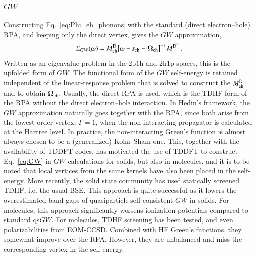 \documentclass[aip,jcp,reprint,noshowkeys,superscriptaddress]{revtex4-1}
\newcommand{\hhp}{\text{2h1p}}
\newcommand{\pph}{\text{2p1h}}
\newcommand{\eh}{\text{eh}}
\begin{document}
\subsubsection{$GW$}

Constructing Eq.~\eqref{eq:Phi_eh_phonons} with the standard (direct
electron--hole) RPA, and keeping only the direct vertex, gives the $GW$
approximation, 
\begin{equation}
\Sigma_{GW}(\omega)
=
M^{\rm D}_{\eh}
\big[
\omega-s_{\eh}-\boldsymbol\Omega_{\eh}
\big]^{-1}
M^{\rm D^{\dagger}} \;.
\label{eq:GW}
\end{equation}
Written as an eigenvalue problem in the $\pph$ and $\hhp$ spaces, this is
the upfolded form of $GW$.\cite{Bintrim2021,Monino2023}
The functional form of the $GW$ self-energy is retained independent of the 
linear-response problem that is solved to construct the $M^{\rm D}_{\eh}$ and to 
obtain $\boldsymbol\Omega_{\eh}$. Usually, the direct RPA is used, which is 
the TDHF form of the RPA without the direct electron--hole interaction. 
In Hedin's framework, the $GW$ approximation naturally goes together with the RPA, 
since both arise from the lowest-order vertex, $\Gamma=1$, when the non-interacting propagator is 
calculated at the Hartree level. In practice, the non-interacting Green's function is 
almost always chosen to be a (generalized) Kohn--Sham one.\cite{Hybertsen1986} 
This, together with the availability of TDDFT codes, has motivated the use of 
TDDFT to construct Eq.~\eqref{eq:GW} in $GW$ calculations for solids,
\cite{Hybertsen1987,Northrup1987,Northrup1989,DelSole1994,Morris2007,Chen2015,Sharma2011,Schmidt2017,Ma2019,Olsen2019}
but also in molecules,\cite{Tiago2006,vanSetten2013,Hung2016,Hung2017,Ma2019}
and it is to be noted that local vertices from the same kernels have also been placed in the
self-energy.\cite{Northrup1987,Northrup1989,Mahan1989,DelSole1994,Shirley1996,Hindgren1997,Takada2001,Bruneval2005,Tiago2006,Morris2007,Romaniello2009,Hung2016,Hung2017,Schmidt2017,Hellgren2018,Ma2019,Olsen2019,Tal2021,Kutepov2022,Lorin2023,Tal2024}
More recently, the solid state community has used statically screened TDHF, i.e. the usual 
BSE. This approach is quite successful as it
lowers the overestimated band gaps of quasiparticle
self-consistent $GW$ in solids.\cite{Shishkin2007,Cunningham2018,Sakakibara2020,Cunningham2023}
For molecules, this approach significantly worsens ionization potentials\cite{Forster2025}
compared to standard qs$GW$.
For molecules, TDHF screening has been tested,\cite{Bruneval2021,Patterson2024}
and even polarizabilities from EOM-CCSD.\cite{Lewis2019}
Combined with HF Green's functions, they somewhat improve over the RPA. However, 
they are unbalanced and miss the corresponding vertex in the self-energy.\cite{Forster2024}
\end{document}
